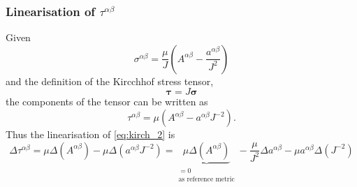 \documentclass[../main.tex]{subfiles}
\begin{document}
\begin{appendices}
\subsubsection{Linearisation of \texorpdfstring{$\tau^{\alpha \beta}$}{Kircchhof stress tensor}}
Given
\begin{equation}\label{eq:sig_ab}
    \sigma^{\alpha \beta} = \frac{\mu}{J} \left( A^{\alpha \beta} - \frac{a^{\alpha \beta}}{J^{2}} \right) 
    \end{equation}
and the definition of the Kircchhof stress tensor,     
    \begin{equation}\label{eq:kirch}
    \boldsymbol{\tau} = J \boldsymbol{\sigma}
    \end{equation}
the components of the tensor can be written as
    \begin{equation}\label{eq:kirch_2}
    \tau^{\alpha \beta} = \mu \left( A^{\alpha \beta} - a^{\alpha \beta} J^{-2} \right).
    \end{equation}
Thus the linearisation of \eqref{eq:kirch_2} is
    \begin{equation}\label{eq:del_kirch}
        \Delta \tau^{\alpha \beta} = \mu \Delta \left( A^{\alpha \beta} \right) - \mu \Delta \left( a^{\alpha \beta} J^{-2} \right) = \underbrace{\mu \Delta \left( A^{\alpha \beta} \right)}_{\substack{= 0 \\ \text{as reference metric}}} - \frac{\mu}{J^{2}} \Delta a^{\alpha \beta} - \mu a^{\alpha \beta} \Delta \left( J^{-2} \right)
    \end{equation}
    

\end{appendices}
\end{document}
